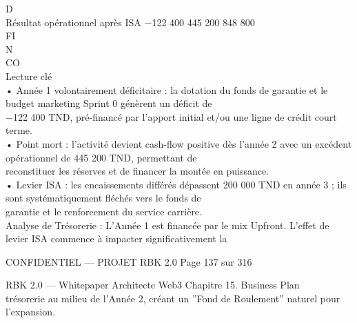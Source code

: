 \documentclass[12pt,landscape,a4paper]{article}
\newenvironment{confidential}
{\begin{tcolorbox}[
    colback=rbkred!5!white,
    colframe=rbkred!75!black,
    title=CONFIDENTIEL,
    fonttitle=\bfseries\color{white},
    coltitle=rbkred!75!black,
    breakable,
    enhanced,
    frame hidden,
    borderline west={2pt}{0pt}{rbkred!75!black}
]}
{\end{tcolorbox}}
\begin{document}
D\\
Résultat opérationnel après ISA           −122 400           445 200          848 800\\
\vspace{0.5em}
\vspace{0.5em}
\vspace{0.5em}
\vspace{0.5em}
FI\\
N\\
CO\\
Lecture clé\\
• Année 1 volontairement déficitaire : la dotation du fonds de garantie et le budget marketing Sprint 0 génèrent un déficit de\\
−122 400 TND, pré-financé par l’apport initial et/ou une ligne de crédit court terme.\\
\vspace{0.5em}
• Point mort : l’activité devient cash-flow positive dès l’année 2 avec un excédent opérationnel de 445 200 TND, permettant de\\
reconstituer les réserves et de financer la montée en puissance.\\
\vspace{0.5em}
• Levier ISA : les encaissements différés dépassent 200 000 TND en année 3 ; ils sont systématiquement fléchés vers le fonds de\\
garantie et le renforcement du service carrière.\\
\vspace{0.5em}
Analyse de Trésorerie : L’Année 1 est financée par le mix Upfront. L’effet de levier ISA commence à impacter significativement la\\
\vspace{0.5em}
\vspace{0.5em}
\begin{confidential}CONFIDENTIEL — PROJET RBK 2.0                                 Page 137 sur 316\end{confidential}
RBK 2.0 — Whitepaper Architecte Web3                                                                             Chapitre 15. Business Plan\\
\vspace{0.5em}
\vspace{0.5em}
trésorerie au milieu de l’Année 2, créant un ”Fond de Roulement” naturel pour l’expansion.\\
\vspace{0.5em}
\vspace{0.5em}
\end{document}
